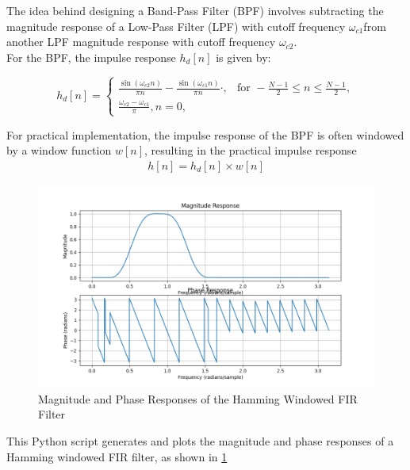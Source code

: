 \documentclass{article}
\begin{document}
The idea behind designing a Band-Pass Filter (BPF) involves subtracting the magnitude response of a Low-Pass Filter (LPF) with cutoff frequency $\omega_{c1}$from another LPF magnitude response with cutoff frequency \(\omega_{c2}\).\\

For the BPF, the impulse response \(h_d[n]\) is given by:

\begin{equation}
h_d[n] = \begin{cases}
    \frac{{\sin(\omega_{c2} n)}}{\pi n} - \frac{{\sin(\omega_{c1} n)}}{\pi n} \cdot , & \text{for } -\frac{N - 1}{2} \leq n \leq \frac{N - 1}{2}, \\
  \frac{{\omega_{c2} - \omega_{c1}}}{{\pi}},n=  0,
\end{cases}
\end{equation}

For practical implementation, the impulse response of the BPF is often windowed by a window function \( w[n] \), resulting in the practical impulse response 
\begin{align}
 h[n] = h_d[n] \times w[n] 
\end{align}
\begin{figure}[ht]
  \centering
  \includegraphics[scale=0.7]{../figs/bphase_response.png}
  \caption{Magnitude and Phase Responses of the Hamming Windowed FIR Filter}
  \label{fig:bpf}
\end{figure}
\begin{center}
\end{center}

This Python script generates and plots the magnitude and phase responses of a Hamming windowed FIR filter, as shown in \ref{fig:bpf}
\end{document}
